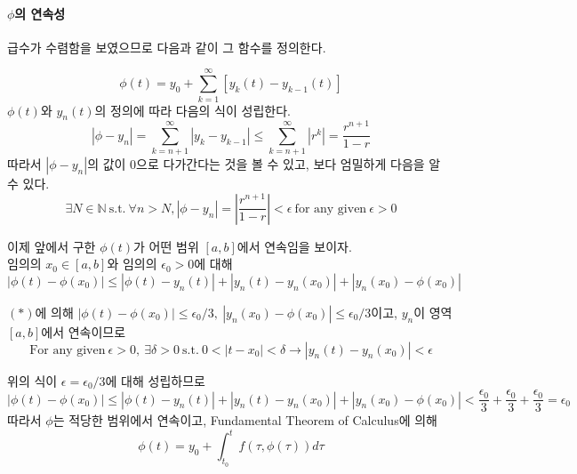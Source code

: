 \documentclass[a4paper,10pt]{article}
\begin{document}
\paragraph{$\phi$의 연속성}
급수가 수렴함을 보였으므로 다음과 같이 그 함수를 정의한다.

\begin{displaymath}
    \phi(t) = y_0 + \sum_{k = 1}^{\infty}[y_k(t) - y_{k-1}(t)]
\end{displaymath}
$\phi(t)$와 $y_n(t)$의 정의에 따라 다음의 식이 성립한다.
\begin{displaymath}
    \left| \phi - y_n \right| = \sum_{k = n+1}^\infty \left| y_k - y_{k-1} \right| \leq \sum_{k = n+1}^\infty \left| r^k \right| = \frac{r^{n+1}}{1-r}
\end{displaymath}
따라서 $|\phi - y_n|$의 값이 0으로 다가간다는 것을 볼 수 있고, 보다 엄밀하게 다음을 알 수 있다.
\begin{equation}
  \exists N \in \mathbb{N} \ \text{s.t.} \ \forall n > N, |\phi - y_n| = \left| \frac{r^{n+1}}{1-r} \right| < \epsilon \ \text{for any given} \ \epsilon > 0 \tag{\ast} \label{flooreq}
\end{equation}

이제 앞에서 구한 $\phi(t)$가 어떤 범위 $[a, b]$에서 연속임을 보이자.\\

임의의 $x_0 \in [a, b]$와 임의의 $\epsilon_0 > 0$에 대해
\begin{displaymath}
  \left| \phi(t) - \phi(x_0) \right| \leq \left| \phi(t) - y_n(t) \right| + \left| y_n(t) - y_n(x_0) \right| + \left| y_n(x_0) - \phi(x_0) \right|
\end{displaymath}

$(\ast)$에 의해 $ \left| \phi(t) - \phi(x_0) \right| \leq \epsilon_0 / 3, \ \left| y_n(x_0) - \phi(x_0) \right| \leq \epsilon_0 / 3$이고, $y_n$이 영역 $[a,b]$에서 연속이므로
\begin{displaymath}
  \text{For any given}\  \epsilon > 0,\ \exists \delta > 0 \ \text{s.t.} \ 0 < |t - x_0| < \delta \longrightarrow |y_n(t) - y_n(x_0)| < \epsilon 
\end{displaymath}

위의 식이 $\epsilon = \epsilon_0 / 3$에 대해 성립하므로
\begin{displaymath}
  \left| \phi(t) - \phi(x_0) \right| \leq \left| \phi(t) - y_n(t) \right| + \left| y_n(t) - y_n(x_0) \right| + \left| y_n(x_0) - \phi(x_0) \right| < \frac{\epsilon_0}{3} + \frac{\epsilon_0}{3} + \frac{\epsilon_0}{3} = \epsilon_0
\end{displaymath}
따라서 $\phi$는 적당한 범위에서 연속이고, Fundamental Theorem of Calculus에 의해 
\begin{displaymath}
  \phi(t) = y_0 + \int_{t_0}^{t}f(\tau, \phi(\tau)) d \tau
\end{displaymath}
\end{document}
